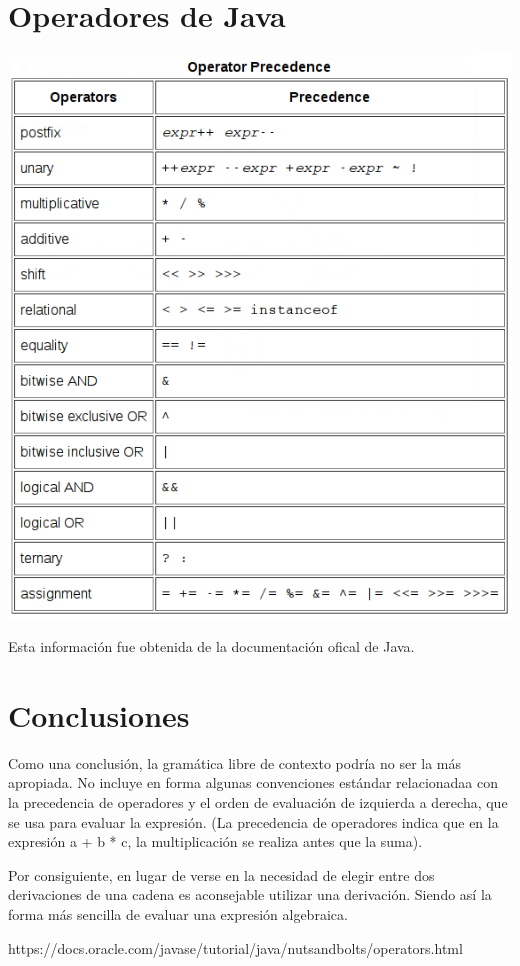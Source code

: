 \documentclass[a4paper, 11pt]{article}
\begin{document}
\section*{Operadores de Java}

\begin{center}
  \includegraphics[scale=0.5]{java_operators}
\end{center}

Esta información fue obtenida de la documentación ofical de Java. \cite{java}
\section*{Conclusiones }
Como una conclusión, la gramática libre de contexto podría no ser la más apropiada. No incluye en forma algunas convenciones estándar relacionadaa con la precedencia de operadores y el orden de evaluación de izquierda a derecha, que se usa para evaluar la expresión. (La precedencia de operadores indica que en la expresión a + b * c, la multiplicación se realiza antes que la suma). 

Por consiguiente, en lugar de verse en la necesidad de elegir entre dos derivaciones de una cadena es aconsejable utilizar una derivación. Siendo así la forma más sencilla de evaluar una expresión algebraica.

\begin{thebibliography}{20}
 https://docs.oracle.com/javase/tutorial/java/nutsandbolts/operators.html
\end{thebibliography}
\end{document}
